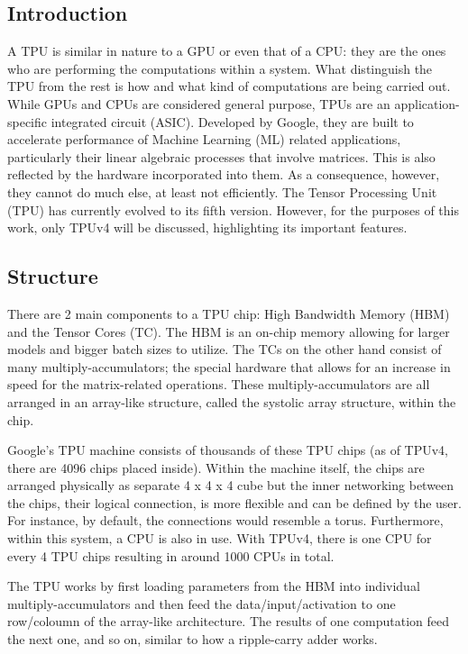 \subsection{Introduction}
\label{subsec:introduction2}
A TPU is similar in nature to a GPU or even that of a CPU: they are the ones who are performing the computations within a system.
What distinguish the TPU from the rest is how and what kind of computations are being carried out.
While GPUs and CPUs are considered general purpose, TPUs are an application-specific integrated circuit (ASIC).
Developed by Google, they are built to accelerate performance of Machine Learning (ML) related applications, particularly their linear algebraic processes that involve matrices.
This is also reflected by the hardware incorporated into them.
As a consequence, however, they cannot do much else, at least not efficiently.
The Tensor Processing Unit (TPU) has currently evolved to its fifth version.
However, for the purposes of this work, only TPUv4 will be discussed, highlighting its important features.

\subsection{Structure}
\label{subsec:structure}
There are 2 main components to a TPU chip: High Bandwidth Memory (HBM) and the Tensor Cores (TC).
The HBM is an on-chip memory allowing for larger models and bigger batch sizes to utilize.
The TCs on the other hand consist of many multiply-accumulators; the special hardware that allows for an increase in speed for the matrix-related operations.
These multiply-accumulators are all arranged in an array-like structure, called the systolic array structure, within the chip.

Google’s TPU machine consists of thousands of these TPU chips (as of TPUv4, there are 4096 chips placed inside).
Within the machine itself, the chips are arranged physically as separate 4 x 4 x 4 cube but the inner networking between the chips, their logical connection, is more flexible and can be defined by the user.
For instance, by default, the connections would resemble a torus.
Furthermore, within this system, a CPU is also in use.
With TPUv4, there is one CPU for every 4 TPU chips resulting in around 1000 CPUs in total.

The TPU works by first loading parameters from the HBM into individual multiply-accumulators and then feed the data/input/activation to one row/coloumn of the array-like architecture.
The results of one computation feed the next one, and so on, similar to how a ripple-carry adder works.

